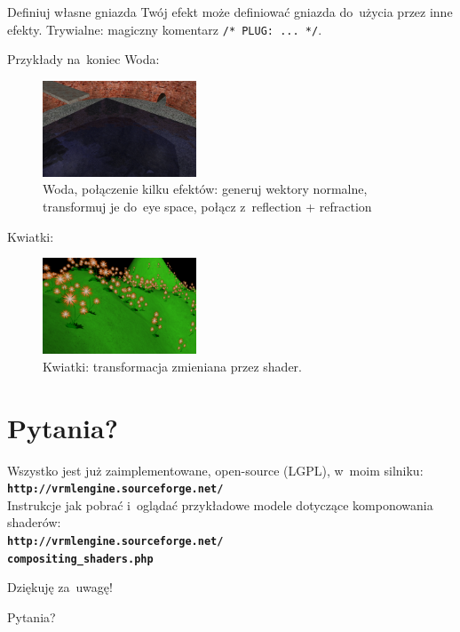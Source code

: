 \documentclass{beamer}
\begin{document}
\begin{frame}{Definiuj własne gniazda}
Twój efekt może definiować gniazda do~użycia przez inne efekty.
Trywialne: magiczny komentarz \texttt{/* PLUG: ... */}.
\end{frame}

\begin{frame}{Przykłady na~koniec}
Woda:

\begin{figure}
  \centering
  \includegraphics[width=1.8in]{../water_shaders_3}
  \caption{Woda, połączenie kilku efektów: generuj wektory normalne, transformuj je do~eye space, połącz z~reflection + refraction}
\end{figure}

Kwiatki:

\begin{figure}
  \centering
  \includegraphics[width=1.8in]{../flowers}
  \caption{Kwiatki: transformacja zmieniana przez shader.}
\end{figure}
\end{frame}

\section{Pytania?}

\begin{frame}[t]

\begin{center}
{\small
Wszystko jest już zaimplementowane, open-source (LGPL), w~moim silniku:\\
{\color{blue} \textbf{\texttt{http://vrmlengine.sourceforge.net/}}}\\
Instrukcje jak pobrać i~oglądać przykładowe modele dotyczące komponowania
shaderów:\\
{\color{blue} \textbf{\texttt{http://vrmlengine.sourceforge.net/\\
compositing\_shaders.php}}}}
\end{center}

\vspace{0.25in}

\begin{center}
{\Large Dziękuję za~uwagę!}
\end{center}


\begin{center}
{\Huge \alert{Pytania?}}
\end{center}

\end{frame}
\end{document}
